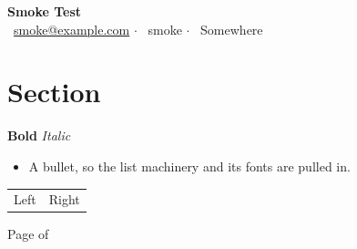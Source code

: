 \documentclass[letterpaper,11pt]{article}
\begin{document}
\begin{center}
  {\huge \textbf{Smoke Test}}\\[4pt]
  {\footnotesize\faEnvelope}~\href{mailto:smoke@example.com}{smoke@example.com}
  $\cdot$ {\footnotesize\faGithub}~smoke
  $\cdot$ {\footnotesize\faMapMarker*}~Somewhere
\end{center}

\section{Section}
\textbf{Bold} \hfill \textit{Italic}
\begin{itemize}[leftmargin=*, noitemsep]
  \item A bullet, so the list machinery and its fonts are pulled in.
\end{itemize}

\begin{tabularx}{\linewidth}{@{}lX@{}}
  Left & Right \\
\end{tabularx}

\begin{center}\footnotesize Page \thepage{} of \pageref{LastPage}\end{center}
\end{document}
